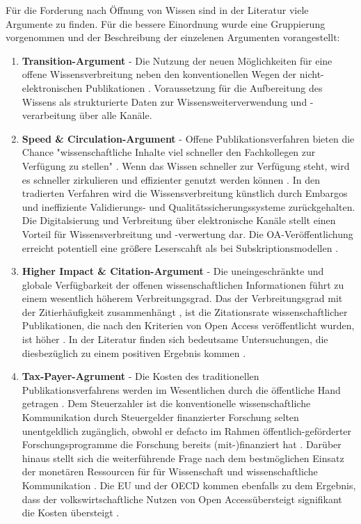 Für die Forderung nach Öffnung von Wissen sind in der Literatur viele Argumente zu finden. Für die bessere Einordnung wurde eine Gruppierung vorgenommen und der Beschreibung der einzelenen Argumenten vorangestellt:
\begin{enumerate}
\item \textbf{Transition-Argument} - Die Nutzung der neuen Möglichkeiten für eine offene Wissensverbreitung neben den konventionellen Wegen der nicht-elektronischen Publikationen \cite{berliner_erklaerung_2003}. Voraussetzung für die Aufbereitung des Wissens als strukturierte Daten zur Wissensweiterverwendung und -verarbeitung über alle Kanäle.
\item \textbf{Speed & Circulation-Argument} - Offene Publikationsverfahren bieten die Chance "wissenschaftliche Inhalte viel schneller den Fachkollegen zur Verfügung zu stellen" \cite{muller_2010_open}. Wenn das Wissen schneller zur Verfügung steht, wird es schneller zirkulieren und effizienter genutzt werden können \cite{Woelfle_2011}. In den tradierten Verfahren wird die Wissensverbreitung künstlich durch Embargos und ineffiziente Validierungs- und Qualitätssicherungssysteme zurückgehalten. Die Digitalsierung und Verbreitung über elektronische Kanäle stellt einen Vorteil für Wissensverbreitung und -verwertung dar. Die OA-Veröffentlichung erreicht potentiell eine größere Leserscahft als bei Subskriptionsmodellen \cite{cope2014future}.
\item \textbf{Higher Impact & Citation-Argument} - Die uneingeschränkte und globale Verfügbarkeit der offenen wissenschaftlichen Informationen führt zu einem wesentlich höherem Verbreitungsgrad\cite{muller_2010_open}. Das der Verbreitungsgrad mit der Zitierhäufigkeit zusammenhängt \cite{muller_2010_open}, ist die Zitationsrate wissenschaftlicher Publikationen, die nach den Kriterien von Open Access veröffentlicht wurden, ist höher \cite{cite:21a}. In der Literatur finden sich bedeutsame Untersuchungen, die diesbezüglich zu einem positiven Ergebnis kommen \cite{Lawrence_2001} \cite{Jeffrey_2008} \cite{Eysenbach_2006} \cite{Antelman_2004}.
\item \textbf{Tax-Payer-Agrument} - Die Kosten des traditionellen Publikationsverfahrens werden im Wesentlichen durch die öffentliche Hand getragen \cite{muller_2010_open}. Dem Steuerzahler ist die konventionelle wissenschaftliche Kommunikation durch Steuergelder finanzierter Forschung selten unentgeldlich zugänglich, obwohl er defacto im Rahmen öffentlich-geförderter Forschungsprogramme die Forschung bereits (mit-)finanziert hat \cite{suber_2003_taxpayer} \cite{Adema_2014_open_access}. Darüber hinaus stellt sich die weiterführende Frage nach dem bestmöglichen Einsatz der monetären Ressourcen für für Wissenschaft und wissenschaftliche Kommunikation \cite{Glasziou_2014} \cite{altman_1994_scandal}. Die EU und der OECD kommen ebenfalls zu dem Ergebnis, dass der volkswirtschaftliche Nutzen von Open Accessübersteigt signifikant die Kosten übersteigt \cite{WD_bundestag_2009}.

\end{enumerate}
